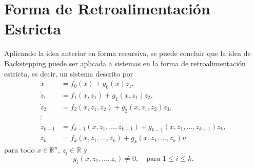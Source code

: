 \section{Forma de Retroalimentación Estricta}
Aplicando la idea anterior en forma recursiva, se puede concluir que la idea de Backstepping puede ser aplicada a sistemas en la forma de retroalimentación estricta, es decir, un sistema descrito por
\begin{equation*}
	\begin{aligned}
		\dot{x} &= f_0(x) + g_0(x)z_1, \\
		\dot{z}_1 &= f_1(x, z_1) + g_1(x, z_1)z_2, \\
		\dot{z}_2 &= f_2(x, z_1, z_2) + g_2(x, z_1, z_2)z_3, \\
		\vdots \\
		\dot{z}_{k-1} &= f_{k-1}(x, z_1, \ldots, z_{k-1}) + g_{k-1}(x, z_1, \ldots, z_{k-1})z_k, \\
		\dot{z}_k &= f_k(x, z_1, \ldots, z_k) + g_k(x, z_1, \ldots, z_k)u
	\end{aligned}
\end{equation*}
para todo $x \in \mathbb{R}^n$, $z_i \in \mathbb{R}$ y
\begin{equation*}
	g_i(x, z_1, \ldots, z_i) \neq 0, \quad \text{para } 1 \leq i \leq k.
\end{equation*}


